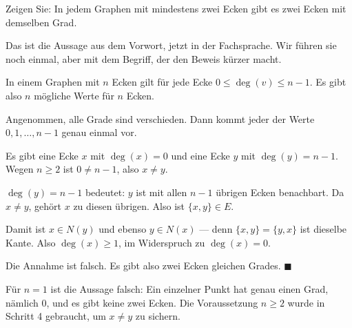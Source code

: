 \begin{aufgabe}
Zeigen Sie: In jedem Graphen mit mindestens zwei Ecken gibt es zwei Ecken mit demselben Grad.

\loesung
{}
Das ist die Aussage aus dem Vorwort, jetzt in der Fachsprache. Wir führen sie noch einmal, aber mit dem Begriff, der den Beweis kürzer macht.

In einem Graphen mit $n$ Ecken gilt für jede Ecke $0 \le \deg(v) \le n-1$. Es gibt also $n$ mögliche Werte für $n$ Ecken.

Angenommen, alle Grade sind verschieden. Dann kommt jeder der Werte $0, 1, \ldots, n-1$ genau einmal vor.

Es gibt eine Ecke $x$ mit $\deg(x) = 0$ und eine Ecke $y$ mit $\deg(y) = n-1$. Wegen $n \ge 2$ ist $0 \neq n-1$, also $x \neq y$.

$\deg(y) = n-1$ bedeutet: $y$ ist mit allen $n-1$ übrigen Ecken benachbart. Da $x \neq y$, gehört $x$ zu diesen übrigen. Also ist $\{x,y\} \in E$.

Damit ist $x \in N(y)$ und ebenso $y \in N(x)$ --- denn $\{x,y\} = \{y,x\}$ ist dieselbe Kante. Also $\deg(x) \ge 1$, im Widerspruch zu $\deg(x) = 0$.

Die Annahme ist falsch. Es gibt also zwei Ecken gleichen Grades. $\blacksquare$

Für $n = 1$ ist die Aussage falsch: Ein einzelner Punkt hat genau einen Grad, nämlich $0$, und es gibt keine zwei Ecken. Die Voraussetzung $n \ge 2$ wurde in Schritt 4 gebraucht, um $x \neq y$ zu sichern.
\end{aufgabe}


